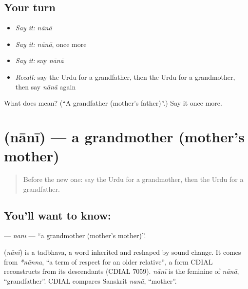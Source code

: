 \subsection*{Your turn}
\begin{itemize}
\raggedright
  \item \emph{Say it:} \emph{nānā}
  \item \emph{Say it:} \emph{nānā}, once more
  \item \emph{Say it:} say \emph{nānā}
  \item \emph{Recall:} say the Urdu for a grandfather, then the Urdu for a grandmother, then say \emph{nānā} again
\end{itemize}

\begin{tcolorbox}[breakable,colback=teal!4,colframe=teal!35!black,title={Before you move on}]
What does  mean? (\textquotedblleft{}A grandfather (mother's father)\textquotedblright{}.) Say it once more.
\end{tcolorbox}
\section[\texorpdfstring{\ur{نانی} (nānī)}{نانی (nānī)}]{ (nānī) — a grandmother (mother's mother)}

\label{lesson:UR-C44-nani}



\begin{quote}
Before the new one: say the Urdu for a grandmother, then the Urdu for a grandfather.
\end{quote}

\subsection*{You'll want to know: }
\textbf{} — \emph{nānī} — \textquotedblleft{}a grandmother (mother's mother)\textquotedblright{}.

\begin{cousinweb}
\textbf{} (\emph{nānī}) is a tadbhava, a word inherited and reshaped by sound change. It comes from \emph{*nānna}, \textquotedblleft{}a term of respect for an older relative\textquotedblright{}, a form CDIAL reconstructs from its descendants (CDIAL 7059). \emph{nānī} is the feminine of \emph{nānā}, \textquotedblleft{}grandfather\textquotedblright{}. CDIAL compares Sanskrit \emph{nanā}, \textquotedblleft{}mother\textquotedblright{}.
\end{cousinweb}

